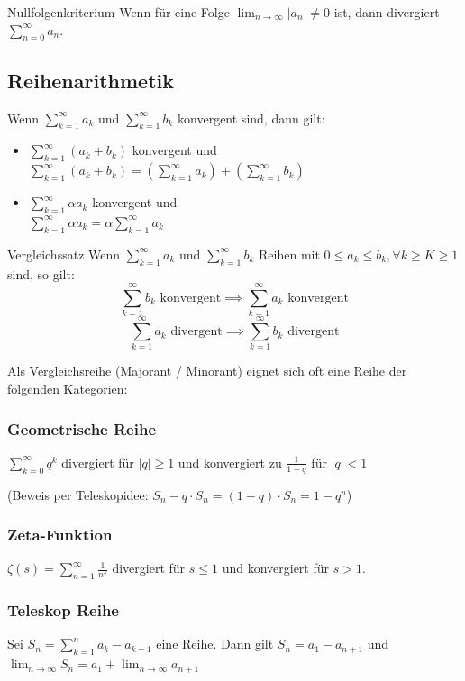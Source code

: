 \documentclass[a4paper,fontsize = 7pt]{scrartcl}
\def\limn{\lim_{n\to \infty}}
\def\sumk{\sum_{k=1}^\infty}
\def\sumn{\sum_{n=0}^\infty}
\begin{document}
\begin{subbox}{Nullfolgenkriterium}
  \vspace{-4pt}
 Wenn für eine Folge $\limn |a_n| \ne 0$ ist, dann divergiert $\sumn a_n$.
 \vspace{-4pt}
\end{subbox}


\subsection{Reihenarithmetik}
Wenn $\sumk a_k$ und $\sumk b_k$ konvergent sind, dann gilt:
\begin{itemize}
 \item $\sumk (a_k + b_k)$ konvergent und $\sumk (a_k + b_k) = \left( \sumk a_k \right) + \left( \sumk b_k \right)$
 \item $\sumk \alpha a_k$ konvergent und \\$\sumk \alpha a_k = \alpha \sumk a_k$
\end{itemize}


\begin{mainbox}{Vergleichssatz}
  \vspace{-4pt}
Wenn $\sumk a_k$ und $\sumk b_k$ Reihen mit $0 \le a_k \le b_k, \forall k \ge K \ge 1$ sind, so gilt:
$$\sumk b_k \text{ konvergent} \implies \sumk a_k \text{ konvergent}$$ 
$$\sumk a_k \text{ divergent} \implies \sumk b_k \text{ divergent}$$ 
  \vspace{-12pt}
\end{mainbox}

Als Vergleichsreihe (Majorant / Minorant) eignet sich oft eine Reihe der folgenden Kategorien:
\subsubsection{Geometrische Reihe} 
$\sum_{k=0}^\infty q^k$ divergiert für $|q| \ge 1$ und konvergiert zu $\frac{1}{1 - q}$ für $|q| < 1$

(Beweis per Teleskopidee: $S_n - q \cdot S_n = (1-q) \cdot S_n = 1 - q^n$)
\subsubsection{Zeta-Funktion}
$\zeta(s) = \sum_{n=1}^\infty \frac{1}{n^s}$ divergiert für $s \le 1$ und konvergiert für $s > 1$.
\subsubsection{Teleskop Reihe}
Sei $S_n = \sum_{k=1}^{n} a_k - a_{k+1}$ eine Reihe. Dann gilt $S_n = a_1 - a_{n+1}$ und $\limn S_n = a_1 + \limn a_{n+1}$
\end{document}
